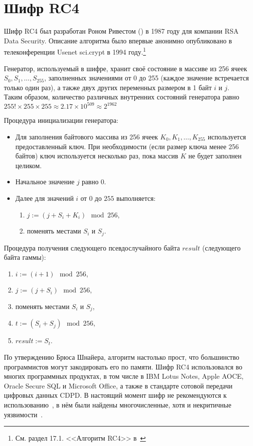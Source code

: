 \section{Шифр RC4}\label{rc4}

Шифр RC4 был разработан Роном Ривестом () в 1987 году для компании RSA Data Security. Описание алгоритма было впервые анонимно опубликовано в телеконференции Usenet sci.crypt в 1994 году.\footnote{См. раздел 17.1. <<Алгоритм RC4>> в~\cite{Schneier:2002}}

Генератор, используемый в шифре, хранит своё состояние в массиве из 256 ячеек $S_0, S_1, \dots, S_{255}$, заполненных значениями от 0 до 255 (каждое значение встречается только один раз), а также двух других переменных размером в 1 байт $i$ и $j$. Таким образом, количество различных внутренних состояний генератора равно $255! \times 255 \times 255 \approx 2.17 \times 10^{509} \approx 2^{1962}$

Процедура инициализации генератора:
\begin{itemize}
	\item Для заполнения байтового массива из 256 ячеек $K_0, K_1, \dots, K_{255}$ используется предоставленный ключ. При необходимости (если размер ключа менее 256 байтов) ключ используется несколько раз, пока массив $K$ не будет заполнен целиком.
	\item Начальное значение $j$ равно $0$.
	\item Далее для значений $i$ от $0$ до $255$ выполняется:
	\begin{enumerate}
		\item $j:= (j + S_i + K_i) \mod 256$,
		\item поменять местами $S_i$ и $S_j$.
	\end{enumerate}
\end{itemize}

Процедура получения следующего псевдослучайного байта $result$ (следующего байта гаммы):
\begin{enumerate}
	\item $ i := (i + 1) \mod 256$,
	\item $ j := (j + S_i) \mod 256$,
	\item поменять местами $S_i$ и $S_j$,
	\item $ t := ( S_i + S_j ) \mod 256$,
	\item $ result := S_t$.
\end{enumerate}

По утверждению Брюса Шнайера, алгоритм настолько прост, что большинство программистов могут закодировать его по памяти. Шифр RC4 использовался во многих программных продуктах, в том числе в IBM Lotus Notes, Apple AOCE, Oracle Secure SQL и Microsoft Office, а также в стандарте сотовой передачи цифровых данных CDPD. В настоящий момент шифр не рекомендуются к использованию~\cite{rfc7465}, в нём были найдены многочисленные, хотя и некритичные уязвимости~\cite{Fluhrer:Mantin:Shamir:2001,Mantin:Shamir:2002,Paul:Maitra:2007,Sepehrdad:Vaudenay:Vuagnoux:2011}.

